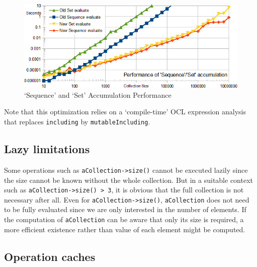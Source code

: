 \documentclass{llncs}
\begin{document}
\begin{figure}
	\begin{center}
		\includegraphics[width=4.5in]{AccumulationPerformance.png}
	\end{center}
	\caption{`Sequence' and `Set' Accumulation Performance}
	\label{fig:AccumulationPerformance}
\end{figure}


Note that this optimization relies on a `compile-time' OCL expression analysis that replaces \verb$including$ by \verb$mutableIncluding$.



\subsection{Lazy limitations}

Some operations such as \verb$aCollection->size()$ cannot be executed lazily since the size cannot be known without the whole collection. But in a suitable context such as \verb$aCollection->size() > 3$, it is obvious that the full collection is not necessary after all. Even for \verb$aCollection->size()$, \verb$aCollection$ does not need to be fully evaluated since we are only interested in the number of elements. If the computation of \verb$aCollection$ can be aware that only its size is required, a more efficient existence rather than value of each element might be computed.
 
\subsection{Operation caches}
\end{document}
